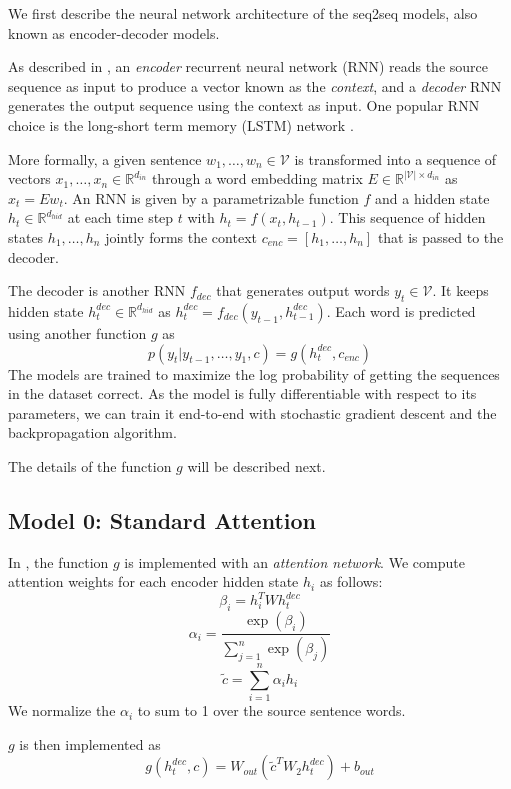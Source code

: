 \documentclass[11pt]{article}
\begin{document}
We first describe the neural network architecture of the seq2seq models, also known as encoder-decoder models.

As described in \cite{bahdanau2014neural}, an \emph{encoder} recurrent neural network (RNN) reads the source sequence as input to produce a vector known as the \emph{context}, and a \emph{decoder} RNN generates the output sequence using the context as input.  One popular RNN choice is the long-short term memory (LSTM) network \citep{hochreiter1997long}.

More formally, a given sentence $w_1, \ldots, w_n \in \mathcal{V}$ is transformed into a sequence of vectors $x_1, \ldots, x_n \in \mathbb{R}^{d_{in}}$ through a word embedding matrix $E \in \mathbb{R}^{|\mathcal{V}| \times d_{in}}$ as $x_t = Ew_t$. An RNN is given by a parametrizable function $f$ and a hidden state $h_t \in \mathbb{R}^{ d_{hid}}$ at each time step $t$ with $h_t = f(x_t, h_{t-1})$. This sequence of hidden states $h_1, \ldots, h_n$ jointly forms the context $c_{enc} = [h_1, \ldots, h_n]$ that is passed to the decoder.


The decoder is another RNN $f_{dec}$ that generates output words $y_t \in \mathcal{V}$. It keeps hidden state $h_t^{dec} \in \mathbb{R}^{d_{hid}}$ as $h_t^{dec} = f_{dec}(y_{t-1}, h_{t-1}^{dec})$. Each word is predicted using another function $g$ as
$$p(y_t | y_{t-1}, \ldots, y_1, c) = g(h_t^{dec}, c_{enc})$$
The models are trained to maximize the log probability of getting the sequences in the dataset correct. As the model is fully differentiable with respect to its parameters, we can train it end-to-end with stochastic gradient descent and the backpropagation algorithm.

The details of the function $g$ will be described next.

\subsection{Model 0: Standard Attention}

In \cite{bahdanau2014neural}, the function $g$ is implemented with an \emph{attention network}. We compute attention weights for each encoder hidden state $h_i$ as follows:
$$\beta_i = h_i^T W h_t^{dec}$$
$$\alpha_i = \frac{\exp(\beta_i)}{\sum_{j=1}^n \exp(\beta_j)}$$
$$\widetilde{c} = \sum_{i=1}^n \alpha_i h_i$$
We normalize the $\alpha_i$ to sum to 1 over the source sentence words.

$g$ is then implemented as
$$g(h_t^{dec}, c) = W_{out}(\widetilde{c}^T W_2 h_t^{dec}) + b_{out}$$
\end{document}
